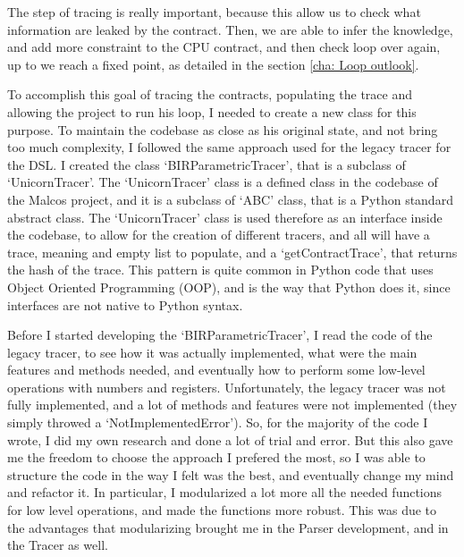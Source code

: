 The step of tracing is really important, because this allow us to check what
information are leaked by the contract. Then, we are able to infer the knowledge,
and add more constraint to the CPU contract, and then check loop over again, up to
we reach a fixed point, as detailed in the section \ref{cha: Loop outlook}.

To accomplish this goal of tracing the contracts, populating the trace and allowing
the project to run his loop, I needed to create a new class for this purpose. To
maintain the codebase as close as his original state, and not bring too much
complexity, I followed the same approach used for the legacy tracer for the DSL.
I created the class `BIRParametricTracer', that is a subclass of `UnicornTracer'.
The `UnicornTracer' class is a defined class in the codebase of the Malcos
project, and it is a subclass of `ABC' class, that is a Python standard abstract
class. The `UnicornTracer' class is used therefore as an interface inside the codebase,
to allow for the creation of different tracers, and all will have a trace,
meaning and empty list to populate, and a `getContractTrace', that returns the
hash of the trace. This pattern is quite common in Python code that uses Object Oriented
Programming (OOP), and is the way that Python does it, since interfaces are not native
to Python syntax.

Before I started developing the `BIRParametricTracer', I read the code of the
legacy tracer, to see how it was actually implemented, what were the main
features and methods needed, and eventually how to perform some low-level operations
with numbers and registers. Unfortunately, the legacy tracer was not fully implemented,
and a lot of methods and features were not implemented (they simply throwed a `NotImplementedError').
So, for the majority of the code I wrote, I did my own research and done a lot of
trial and error. But this also gave me the freedom to choose the approach I
prefered the most, so I was able to structure the code in the way I felt was the
best, and eventually change my mind and refactor it. In particular, I
modularized a lot more all the needed functions for low level operations, and made
the functions more robust. This was due to the advantages that modularizing
brought me in the Parser development, and in the Tracer as well.

